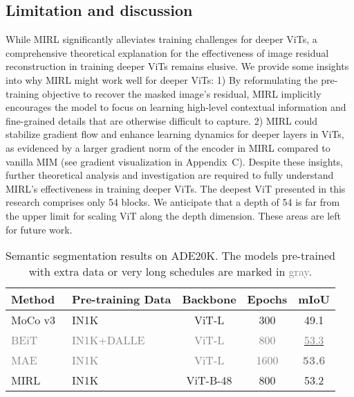\documentclass{article}
\begin{document}
\subsection{Limitation and discussion}
\vspace{5pt}
While MIRL significantly alleviates training challenges for deeper ViTs, a comprehensive theoretical explanation for the effectiveness of image residual reconstruction in training deeper ViTs remains elusive. We provide some insights into why MIRL might work well for deeper ViTs:
1) By reformulating the pre-training objective to recover the masked image's residual, MIRL implicitly encourages the model to focus on learning high-level contextual information and fine-grained details that are otherwise difficult to capture.
2) MIRL could stabilize gradient flow and enhance learning dynamics for deeper layers in ViTs, as evidenced by a larger gradient norm of the encoder in MIRL compared to vanilla MIM (see gradient visualization in Appendix~C).
Despite these insights, further theoretical analysis and investigation are required to fully understand MIRL's effectiveness in training deeper ViTs. The deepest ViT presented in this research comprises only 54 blocks. We anticipate that a depth of 54 is far from the upper limit for scaling ViT along the depth dimension. These areas are left for future work.
\begin{table}[!t]
    \centering
\small
    \renewcommand{\arraystretch}{1.1}
    \addtolength{\tabcolsep}{19.05pt}
    \begin{tabular}{@{}llccc@{}}
    \toprule
        Method & Pre-training Data & Backbone & Epochs & mIoU \\
        \midrule
        MoCo v3~\cite{chen2021empirical}& IN1K & ViT-L & 300 & 49.1 \\
        \textcolor{gray}{BEiT}~\cite{bao2021beit} & \textcolor{gray}{IN1K+DALLE} & \textcolor{gray}{ViT-L} & \textcolor{gray}{800} & \underline{\textcolor{gray}{53.3}} \\
        \textcolor{gray}{MAE}~\cite{he2022masked} & \textcolor{gray}{IN1K} & \textcolor{gray}{ViT-L} & \textcolor{gray}{1600} & \textbf{\textcolor{gray}{53.6}} \\
        MIRL & IN1K &  ViT-B-48 & 800 & 53.2 \\
    \bottomrule \end{tabular}
    \caption{Semantic segmentation results on ADE20K. The models pre-trained with extra data or very long schedules are marked in \textcolor{gray}{gray}.}
    \label{tab: semantic}
\end{table}
\end{document}
